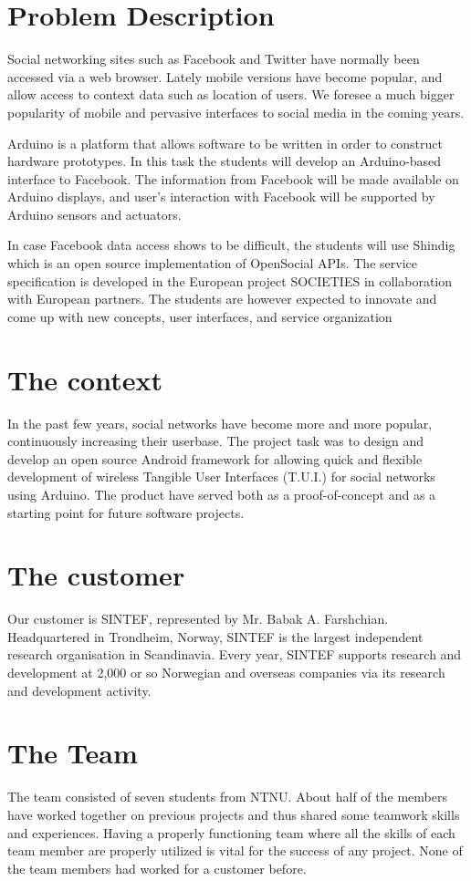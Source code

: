 \section{Problem Description}
Social networking sites such as Facebook and Twitter have normally been accessed  via a web browser. Lately mobile versions have become popular, and allow access to context data such as location of users. We foresee a much bigger popularity of mobile and pervasive interfaces to social media in the coming years. 

Arduino\cite{link:arduino} is a platform that allows software to be written in order to construct hardware 
prototypes. In this task the students will develop an Arduino-based interface to Facebook. The information from 
Facebook will be made available on Arduino displays, and user’s interaction with Facebook will be supported by 
Arduino sensors and actuators.

In case Facebook data access shows to be difficult, the students will use Shindig\cite{link:shinding} which 
is an open source implementation of OpenSocial APIs. The service specification is developed in the European project 
SOCIETIES in collaboration with European partners. The students are however expected to innovate and come up 
with new concepts, user interfaces, and service organization

\section{The context}
In the past few years, social networks have become more and more popular, continuously increasing their userbase.
The project task was to design and develop an open source Android framework for allowing quick and flexible
development of wireless Tangible User Interfaces (T.U.I.) for social networks using Arduino.
The product have served both as a proof-of-concept and as a starting point for future software projects.

\section{The customer}
Our customer is SINTEF, represented by Mr. Babak A. Farshchian.
Headquartered in Trondheim, Norway, SINTEF is the largest independent research organisation in Scandinavia.
Every year, SINTEF supports research and development at 2,000 or so Norwegian and overseas
companies via its research and development activity.

\section{The Team}
The team consisted of seven students from NTNU. About half of the members have worked
together on previous projects and thus shared some teamwork skills and experiences.
Having a properly functioning team where all the skills of each team member are properly
utilized is vital for the success of any project. None of the team members had 
worked for a customer before.


